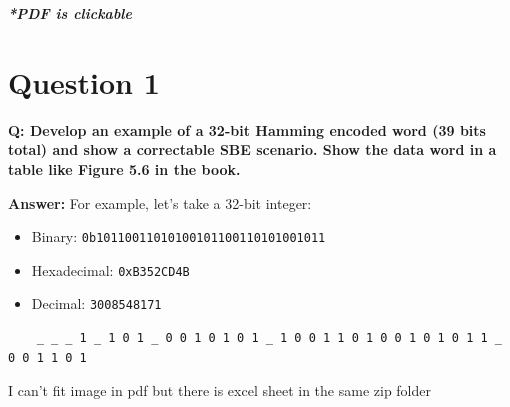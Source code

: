 \documentclass[a4paper,11pt]{article}%
\newenvironment{qanda}{\setlength{\parindent}{0pt}}{\bigskip}
\newcommand{\Q}{\bigskip\bfseries Q: }
\newcommand{\A}{\par\textbf{Answer: } \normalfont}
\begin{document}



\pagebreak

\tableofcontents
\listoffigures
\listoftables
\vfill
\begin{center}
	\textbf{\textit{*PDF is clickable}}
\end{center}

\pagebreak



\begin{qanda}

	\section{Question 1}
	\Q  Develop an example of a 32-bit Hamming encoded word (39 bits total) and show a correctable SBE
	scenario. Show the data word in a table like Figure 5.6 in the book.
	\A
	For example, let's take a 32-bit integer:
	\begin{itemize}
	\item Binary: \texttt{0b10110011010100101100110101001011}
	\item Hexadecimal: \texttt{0xB352CD4B}
	\item Decimal: \texttt{3008548171}
	\end{itemize}
	
	\begin{verbatim}
	_ _ _ 1 _ 1 0 1 _ 0 0 1 0 1 0 1 _ 1 0 0 1 1 0 1 0 0 1 0 1 0 1 1 _ 0 0 1 1 0 1
	\end{verbatim}
	I can't fit image in pdf but there is excel sheet in the same zip folder


\end{qanda}
\end{document}
